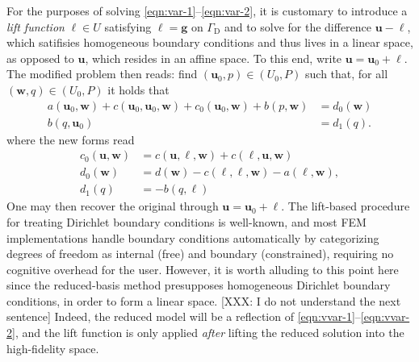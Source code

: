 \documentclass[onecolumn, twoside, a4paper, 11pt]{article}
\begin{document}
For the purposes of solving \eqref{eqn:var-1}--\eqref{eqn:var-2}, it is
customary to introduce a \emph{lift function} $\bm \ell \in U$ satisfying
$\bm{\ell} = \bm{g}$ on $\Gamma_\text{D}$ and to solve for the difference $\bm u - \bm
\ell$, which satifisies homogeneous boundary conditions and thus lives in a
linear space, as opposed to $\bm u$, which resides in an affine space. To this
end, write $\bm u = \bm u_0 + \bm \ell$. The modified problem then reads: find
$(\bm u_0, p) \in (U_0, P)$ such that, for all $(\bm w, q) \in (U_0, P)$ it
holds that
%
\begin{align}
a(\bm u_0, \bm w) + c(\bm u_0, \bm u_0, \bm w) + c_0(\bm u_0, \bm w) +
b(p, \bm w) &= d_0(\bm w)
\label{eqn:vvar-1}\\
  b(q, \bm u_0) &= d_1(q).
\label{eqn:vvar-2}
\end{align}
%
where the new forms read
%
\begin{align}
c_0(\bm u, \bm w)&=
c(\bm u, \bm{\ell}, \bm w)+c(\bm{\ell}, \bm u, \bm w)
\\
d_0(\bm w) &=d(\bm w)-c(\bm{\ell},\bm{\ell},  \bm w)-a(\bm{\ell}, \bm w),
\\
d_1(q)&=-b(q,\bm{\ell})
\end{align}
One may then recover the original through $\bm u = \bm u_0 + \bm \ell$. The lift-based procedure for
treating Dirichlet boundary conditions is well-known, and most FEM implementations handle
boundary conditions automatically by categorizing degrees of freedom as internal
(free) and boundary (constrained), requiring no cognitive overhead for the user.
However, it is worth alluding to this point here since the reduced-basis method
presupposes homogeneous Dirichlet boundary conditions, in order to form a linear space.
[XXX: I do not understand the next sentence]
Indeed, the reduced model will be a reflection of \eqref{eqn:vvar-1}--\eqref{eqn:vvar-2}, and
the lift function is only applied \emph{after} lifting the reduced solution into
the high-fidelity space.
\end{document}
